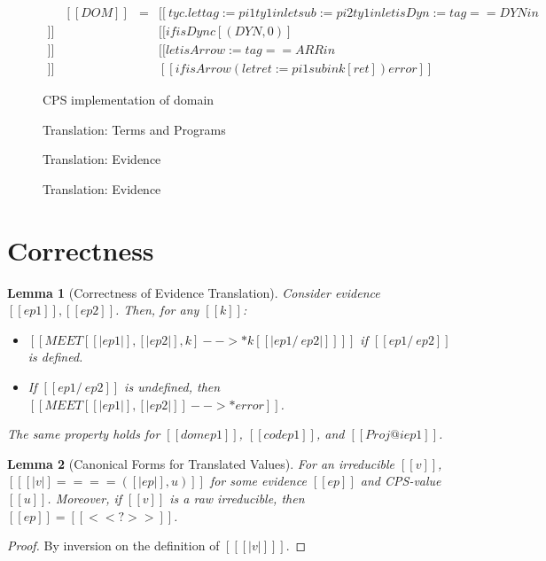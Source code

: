 \documentclass[11pt]{article}
\newtheorem{lemma}{Lemma}[section]
\begin{document}
\begin{figure}
    \begin{align*}
        & [[DOM]] & = & [[\ ty c . let tag := pi1 ty1 in let sub := pi2 ty1 in let isDyn := tag == DYN in \\ ]]
        &&& [[ if isDyn c[(DYN,0)] \\ ]]
        &&& [[let isArrow := tag == ARR in \\ ]]
        &&& [[if isArrow (let ret := pi1 sub in k[ret] ) error ]]
    \end{align*}
    \caption{CPS implementation of domain}
    \label{fig:dom-impl}
    \end{figure}

\begin{figure}
    \ottdefnTransform
    \caption{Translation: Terms and Programs}
    \label{fig:trans-terms}
    \end{figure}
 
    \begin{figure}
        \ottdefnEvTransform
        \caption{Translation: Evidence}
        \label{fig:trans-types}
        \end{figure}

        \begin{figure}
            \ottdefnValTransform
            \caption{Translation: Evidence}
            \label{fig:trans-values}
            \end{figure}

\section{Correctness}

\begin{lemma}[Correctness of Evidence Translation]
  Consider evidence $[[ep1]],[[ep2]]$. Then, for any $[[k]]$:
  \begin{itemize}
      \item $[[MEET[ [|ep1|], [|ep2|], k ] -->* k[ [| ep1 /\ ep2 |] ] ]]$ if $[[ep1 /\ ep2]]$ is defined.
      \item If $[[ep1 /\ ep2]]$ is undefined, then $[[MEET[ [|ep1|], [|ep2|] ] -->* error ]]$.
  \end{itemize}
  The same property holds for $[[dom ep1]]$, $[[cod ep1]]$, and $[[Proj@i ep1]]$.
\end{lemma}

\begin{lemma}[Canonical Forms for Translated Values]
    \label{lem:canonical-trans}
    For an irreducible $[[v]]$, $[[ [|v|] ==== ( [|ep|], u) ]] $ for some evidence $[[ep]]$ and CPS-value $[[u]]$.
    Moreover, if $[[v]]$ is a raw irreducible, then $[[ep]]=[[<<?>>]]$.
\end{lemma}
\begin{proof}
    By inversion on the definition of $[[ [|v|] ]]$.
\end{proof}
\end{document}
